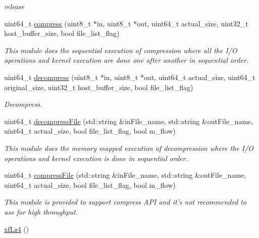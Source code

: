 \begin{DoxyCompactItemize}
\begin{DoxyCompactList}\small\item\em release \end{DoxyCompactList}\item 
uint64\-\_\-t \hyperlink{classxf_1_1compression_1_1xfLz4_a45a50df3cff6267dc53e40173782abb3}{compress} (uint8\-\_\-t $\ast$in, uint8\-\_\-t $\ast$out, uint64\-\_\-t actual\-\_\-size, uint32\-\_\-t host\-\_\-buffer\-\_\-size, bool file\-\_\-list\-\_\-flag)
\begin{DoxyCompactList}\small\item\em This module does the sequential execution of compression where all the I/\-O operations and kernel execution are done one after another in sequential order. \end{DoxyCompactList}\item 
uint64\-\_\-t \hyperlink{classxf_1_1compression_1_1xfLz4_a65869a4ddc168cee2717d6a1ec307050}{decompress} (uint8\-\_\-t $\ast$in, uint8\-\_\-t $\ast$out, uint64\-\_\-t actual\-\_\-size, uint64\-\_\-t original\-\_\-size, uint32\-\_\-t host\-\_\-buffer\-\_\-size, bool file\-\_\-list\-\_\-flag)
\begin{DoxyCompactList}\small\item\em Decompress. \end{DoxyCompactList}\item 
uint64\-\_\-t \hyperlink{classxf_1_1compression_1_1xfLz4_a014c00651904af5d39700bac287effb9}{decompress\-File} (std\-::string \&in\-File\-\_\-name, std\-::string \&out\-File\-\_\-name, uint64\-\_\-t actual\-\_\-size, bool file\-\_\-list\-\_\-flag, bool m\-\_\-flow)
\begin{DoxyCompactList}\small\item\em This module does the memory mapped execution of decompression where the I/\-O operations and kernel execution is done in sequential order. \end{DoxyCompactList}\item 
uint64\-\_\-t \hyperlink{classxf_1_1compression_1_1xfLz4_a71de6fcf62d9257dfd50c11eae2225d0}{compress\-File} (std\-::string \&in\-File\-\_\-name, std\-::string \&out\-File\-\_\-name, uint64\-\_\-t actual\-\_\-size, bool file\-\_\-list\-\_\-flag, bool m\-\_\-flow)
\begin{DoxyCompactList}\small\item\em This module is provided to support compress A\-P\-I and it's not recommended to use for high throughput. \end{DoxyCompactList}\item 
\hypertarget{classxf_1_1compression_1_1xfLz4_ae424eb8b26ebc94d6812a8e96da1a6b6}{\hyperlink{classxf_1_1compression_1_1xfLz4_ae424eb8b26ebc94d6812a8e96da1a6b6}{xf\-Lz4} ()}\label{classxf_1_1compression_1_1xfLz4_ae424eb8b26ebc94d6812a8e96da1a6b6}


\end{DoxyCompactItemize}

